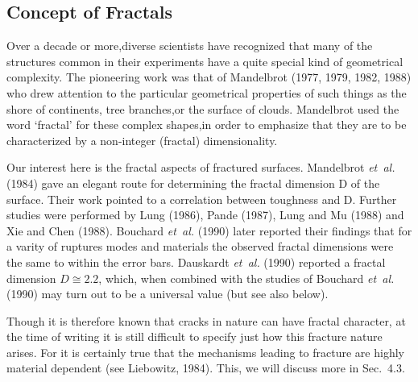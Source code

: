 \begin{appendix}
\section{Concept of Fractals} %
Over a decade or more,diverse scientists have recognized that many 
of the structures common in their experiments have a quite special 
kind of geometrical complexity. The pioneering work was that of 
Mandelbrot (1977, 1979, 1982, 1988) who drew attention to the 
particular geometrical properties of such things as the shore of 
continents, tree branches,or the surface of clouds. Mandelbrot used 
the word `fractal' for these complex shapes,in order to emphasize 
that they are to be characterized by a non-integer (fractal) 
dimensionality.

Our interest here is the fractal aspects of fractured surfaces. 
Mandelbrot {\it et~al.}  (1984) gave an elegant route for determining the 
fractal dimension D of the surface. Their work pointed to a 
correlation between toughness and D. Further studies were performed 
by Lung (1986), Pande (1987), Lung and Mu (1988) and Xie and Chen 
(1988). Bouchard {\it et~al.}  (1990) later reported their findings that for 
a varity of ruptures modes and materials the observed fractal 
dimensions were the same to within the error bars. Dauskardt {\it et~al.}  
(1990) reported a fractal dimension $D\cong 2.2$, which, when 
combined with the studies of Bouchard {\it et~al.}  (1990) may turn out to 
be a universal value (but see also below).

\begin{table} %
\end{table}

Though it is therefore known that cracks in nature can have fractal 
character, at the time of writing it is still difficult to specify 
just how this fracture nature arises. For it is certainly true that 
the mechanisms leading to fracture are highly material dependent (see 
Liebowitz, 1984). This, we will discuss more in Sec.~4.3.


\end{appendix}
